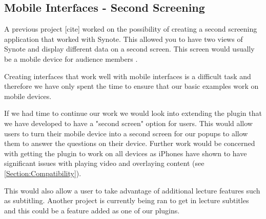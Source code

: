 \subsection{Mobile Interfaces - Second Screening}

A previous project [cite] worked on the possibility of creating a second screening application that worked with Synote. This allowed you to have two views of Synote and display different data on a second screen. This screen would usually be a mobile device for audience members .

Creating interfaces that work well with mobile interfaces is a difficult task and therefore we have only spent the time to ensure that our basic examples work on mobile devices.

If we had time to continue our work we would look into extending the plugin that we have developed to have a "second screen" option for users. This would allow users to turn their mobile device into a second screen for our popups to allow them to answer the questions on their device. Further work would be concerned with getting the plugin to work on all devices as iPhones have shown to have significant issues with playing video and overlaying content (see \autoref{Section:Compatibility}).

This would also allow a user to take advantage of additional lecture features such as subtitling. Another project is currently being ran to get in lecture subtitles and this could be a feature added as one of our plugins.